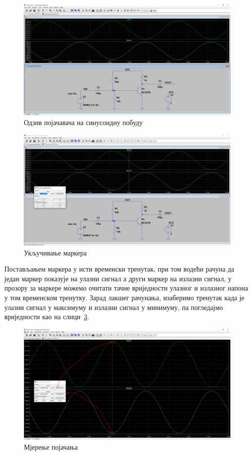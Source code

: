 \begin{figure}[h]
\centering
\includegraphics[width=\figwidth\textwidth]{figs/b7.PNG}
\caption{Одзив појачавача на синусоидну побуду}
\label{Fig:b7-amp}
\end{figure}

\begin{figure}[h]
\centering
\includegraphics[width=\figwidth\textwidth]{figs/b8.PNG}
\caption{Укључивање маркера}
\label{Fig:b8-mar}
\end{figure}

Постављањем маркера у исти временски тренутак, при том водећи рачуна да један маркер показује на улазни сигнал а други маркер на излазни сигнал, у прозору за маркере можемо очитати тачне вриједности улазног и излазног напона у том временском тренутку. Зарад лакшег рачунања, изаберимо тренутак када је улазни сигнал у максимуму и излазни сигнал у минимуму, па погледајмо вриједности као на слици~\ref{Fig:b9-meas}.

\begin{figure}[h]
\centering
\includegraphics[width=\figwidth\textwidth]{figs/b9.PNG}
\caption{Мјерење појачања}
\label{Fig:b9-meas}
\end{figure}

